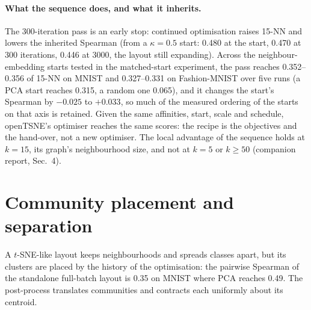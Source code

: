 \documentclass[10pt,twocolumn]{article}
\newcommand{\knn}{15-NN}
\begin{document}
\paragraph{What the sequence does, and what it inherits.} The 300-iteration pass is an early stop: continued
optimisation raises \knn{} and lowers the inherited Spearman (from a $\kappa = 0.5$ start: 0.480 at the start, 0.470 at 300 iterations, 0.446 at
3000, the layout still expanding). Across the neighbour-embedding starts tested in the matched-start experiment, the pass reaches 0.352--0.356
of \knn{} on MNIST and 0.327--0.331 on Fashion-MNIST over five runs (a PCA start reaches 0.315, a random one
0.065), and it changes the start's Spearman by $-0.025$ to $+0.033$, so much of the measured ordering of the starts
on that axis is retained.
Given the same affinities, start, scale and schedule, openTSNE's optimiser reaches the same scores: the recipe is
the objectives and the hand-over, not a new optimiser. The local advantage of the sequence holds at $k = 15$, its
graph's neighbourhood size, and not at $k = 5$ or $k \ge 50$ (companion report, Sec.~4).

\section{Community placement and separation}\label{sec:post}
A $t$-SNE-like layout keeps neighbourhoods and spreads classes apart, but its clusters are placed by the history
of the optimisation: the pairwise Spearman of the standalone full-batch layout is 0.35 on MNIST where PCA reaches
0.49. The post-process translates communities and contracts each uniformly about its centroid.
\end{document}
